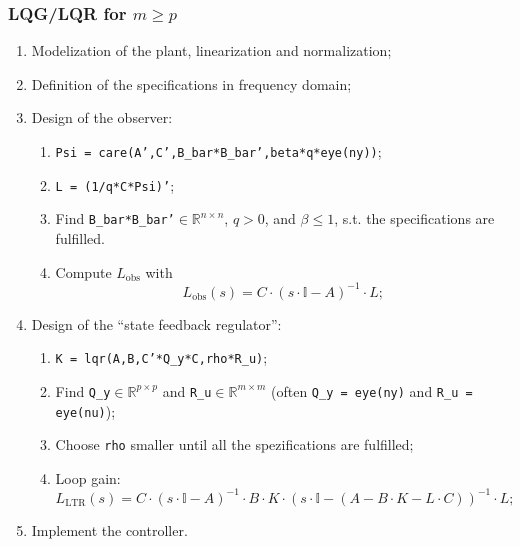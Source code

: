 \documentclass[a4paper,12 pt]{article}
\numberwithin{equation}{section}
\theoremstyle{definition}
\theoremstyle{remark}
\theoremstyle{definition}
\theoremstyle{definition}
\theoremstyle{definition}
\theoremstyle{remark}
\begin{document}
\subsubsection{LQG/LQR for $m\geq p$}
\begin{enumerate}
\item Modelization of the plant, linearization and normalization;
\item Definition of the specifications in frequency domain;
\item Design of the observer:
\begin{enumerate}
\item \texttt{Psi = care(A',C',B\_bar*B\_bar',beta*q*eye(ny))};
\item \texttt{L = (1/q*C*Psi)'};
\item Find \texttt{B\_bar*B\_bar'}$\in\mathbb{R}^{n\times n}$, $q>0$, and $\beta\leq 1$, s.t. the specifications are fulfilled.
\item Compute $L_\text{obs}$ with
\begin{equation}
L_\text{obs}(s)=C\cdot (s\cdot \mathbb{I}-A)^{-1}\cdot L;
\end{equation}
\end{enumerate}
\item Design of the  ``state feedback regulator'':
\begin{enumerate}
\item \texttt{K = lqr(A,B,C'*Q\_y*C,rho*R\_u)};
\item Find \texttt{Q\_y}$\in\mathbb{R}^{p\times p}$ and \texttt{R\_u}$\in\mathbb{R}^{m\times m}$ (often \texttt{Q\_y = eye(ny)} and \texttt{R\_u = eye(nu)});
\item Choose \texttt{rho} smaller until all the spezifications are fulfilled;
\item Loop gain:
\begin{equation}
L_\text{LTR}(s)=C\cdot (s\cdot \mathbb{I}-A)^{-1}\cdot B\cdot K\cdot(s\cdot\mathbb{I}-(A-B\cdot K-L\cdot C))^{-1}\cdot L;
\end{equation}
\end{enumerate}
\item Implement the controller.
\end{enumerate}
\end{document}
